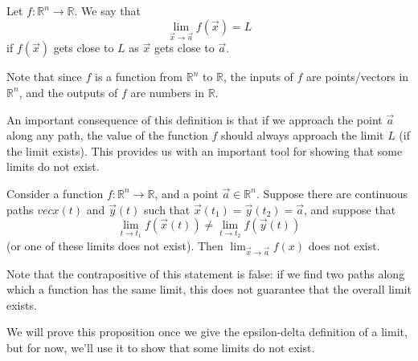 \documentclass{ximera}
\begin{document}
\begin{definition}
Let $f:\mathbb{R}^n\rightarrow \mathbb{R}$. We say that
\[
\lim_{\vec{x}\rightarrow\vec{a}}f(\vec{x})=L
\]
if $f(\vec{x})$ gets close to $L$ as $\vec{x}$ gets close to $\vec{a}$.
\end{definition}

Note that since $f$ is a function from $\mathbb{R}^n$ to $\mathbb{R}$, the inputs of $f$ are points/vectors in $\mathbb{R}^n$, and the outputs of $f$ are numbers in $\mathbb{R}$.

An important consequence of this definition is that if we approach the point $\vec{a}$ along any path, the value of the function $f$ should always approach the limit $L$ (if the limit exists). This provides us with an important tool for showing that some limits do not exist.

\begin{proposition}
Consider a function $f:\mathbb{R}^n\rightarrow \mathbb{R}$, and a point $\vec{a}\in\mathbb{R}^n$. Suppose there are continuous paths $vec{x}(t)$ and $\vec{y}(t)$ such that $\vec{x}(t_1) = \vec{y}(t_2) = \vec{a}$, and suppose that
\[
\lim_{t\rightarrow t_1}f(\vec{x}(t))\neq \lim_{t\rightarrow t_2}f(\vec{y}(t))
\]
(or one of these limits does not exist). Then $\lim_{\vec{x}\rightarrow\vec{a}}f(x)$ does not exist.
\end{proposition}

Note that the contrapositive of this statement is false: if we find two paths along which a function has the same limit, this does not guarantee that the overall limit exists.

We will prove this proposition once we give the epsilon-delta definition of a limit, but for now, we'll use it to show that some limits do not exist.
\end{document}
